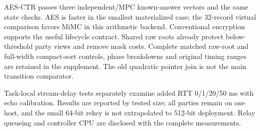 AES-CTR passes three independent/MPC known-answer vectors and the same state checks. AES is faster in the smallest materialized case; the 32-record virtual comparison favors MiMC in this arithmetic backend. Conventional encryption supports the useful lifecycle contract. Shared raw roots already protect below-threshold party views and remove mask costs. Complete matched raw-root and full-width compact-sort controls, phase breakdowns and original timing ranges are retained in the supplement. The old quadratic pointer join is not the main transition comparator.

Task-local stream-delay tests separately examine added RTT 0/1/20/50 ms with echo calibration. Results are reported by tested size; all parties remain on one host, and the small 64-bit rekey is not extrapolated to 512-bit deployment. Relay queueing and controller CPU are disclosed with the complete measurements.
